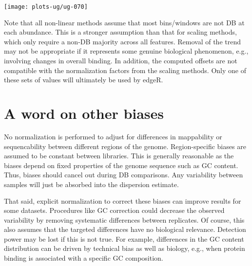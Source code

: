 \documentclass[12pt]{report}
\newcommand{\edger}{edgeR}
\begin{document}
\begin{center}
\texttt{[image: plots-ug/ug-070]}
\end{center}

Note that all non-linear methods assume that most bins/windows are not DB at each abundance. 
This is a stronger assumption than that for scaling methods, which only require a non-DB majority across all features.
Removal of the trend may not be appropriate if it represents some genuine biological phenomenon, e.g., involving changes in overall binding. 
In addition, the computed offsets are not compatible with the normalization factors from the scaling methods.
Only one of these sets of values will ultimately be used by \edger{}.


\section{A word on other biases}
No normalization is performed to adjust for differences in mappability or sequencability between different regions of the genome. 
Region-specific biases are assumed to be constant between libraries. 
This is generally reasonable as the biases depend on fixed properties of the genome sequence such as GC content. 
Thus, biases should cancel out during DB comparisons.
Any variability between samples will just be absorbed into the dispersion estimate. 

That said, explicit normalization to correct these biases can improve results for some datasets.
Procedures like GC correction could decrease the observed variability by removing systematic differences between replicates. 
Of course, this also assumes that the targeted differences have no biological relevance.
Detection power may be lost if this is not true. 
For example, differences in the GC content distribution can be driven by technical bias as well as biology, e.g., when protein binding is associated with a specific GC composition.


\end{document}
